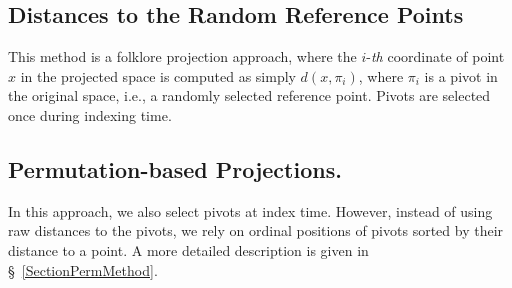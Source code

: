 \begin{appendix}
\subsection{Distances to the Random Reference Points} 
This method is a folklore projection approach,
where the \mbox{$i$-\textit{th}} coordinate of point $x$ in the projected space is computed as simply $d(x, \pi_i)$,
where $\pi_i$ is a pivot in the original space, i.e., a randomly selected reference point.
Pivots are selected once during indexing time.

\subsection{Permutation-based Projections.}
In this approach, we also select  pivots at index time.
However, instead of using raw distances to the pivots,
we rely on ordinal positions of pivots sorted by their distance to a point.  
A more detailed description is given in \S~\ref{SectionPermMethod}.
\end{appendix}
